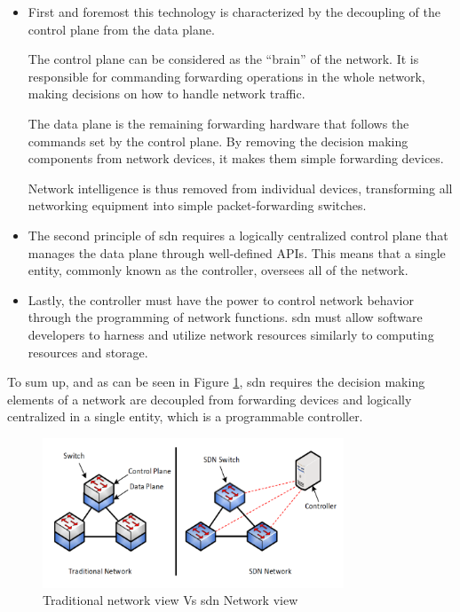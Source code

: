 \begin{itemize}

	\item First and foremost this technology is characterized by the decoupling of the control plane from the data plane. 

    The control plane can be considered as the “brain” of the network. It is responsible for commanding forwarding operations in the whole network, making decisions on how to handle network traffic.  

    The data plane is the remaining forwarding hardware that follows the commands set by the control plane. By removing the decision making components from network devices, it makes them simple forwarding devices.

    Network intelligence is thus removed from individual devices, transforming all networking equipment into simple packet-forwarding switches.

	\item The second principle of \gls{sdn} requires a logically centralized control plane that manages the data plane through well-defined APIs. This means that a single entity, commonly known as the controller, oversees all of the network. 

	\item Lastly, the controller must have the power to control network behavior through the programming of network functions. \gls{sdn} must allow software developers to harness and utilize network resources similarly to computing resources and storage. 

\end{itemize}

To sum up, and as can be seen in Figure \ref{fig:sdn_vs_legacy}, \gls{sdn} requires the decision making elements of a network are decoupled from forwarding devices and logically centralized in a single entity, which is a programmable controller. 

\begin{figure}
	\centering
	\includegraphics[width=0.8\textwidth]{Chapters/Figures/SDNs/sdn_vs_legacy.png}
	\caption{Traditional network view Vs \gls{sdn} Network view\cite{alowa_scalable_2020}}
	\label{fig:sdn_vs_legacy}
\end{figure}

